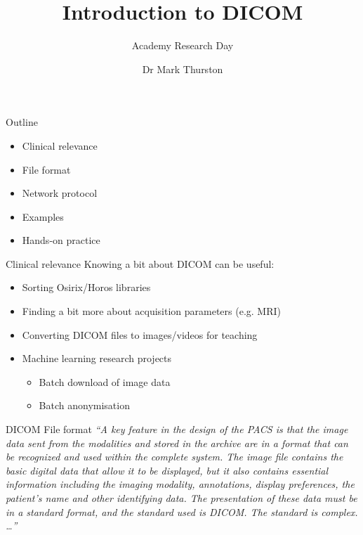 \documentclass{beamer}
\title{Introduction to DICOM}
\subtitle{Academy Research Day}
\author{Dr Mark Thurston}
\institute{\href{https://github.com/plymouth-neuroimaging/research-academy
    }{\faGithub{} plymouth-neuroimaging}
}
\date{\DTMdisplaydate{2023}{07}{28}{Friday}}
\begin{document}
\begin{frame}
    \titlepage{}
\end{frame}

\begin{frame}{Outline}
    \begin{itemize}
        \item{Clinical relevance}
        \item{File format}
        \item{Network protocol}
        \item{Examples}
        \item{Hands-on practice}
    \end{itemize}
\end{frame}

\begin{frame}{Clinical relevance}
    Knowing a bit about DICOM can be useful:
    \begin{itemize}
        \item{Sorting Osirix/Horos libraries}
        \item{Finding a bit more about acquisition parameters (e.g. MRI)}
        \item{Converting DICOM files to images/videos for teaching}
        \item{Machine learning research projects}
            \begin{itemize}
                \item{Batch download of image data}
                \item{Batch anonymisation}
            \end{itemize}
    \end{itemize}
\end{frame}

\begin{frame}{DICOM File format}
    \tiny\textit{{``A key feature in the design of the PACS is that the image
    data sent from the modalities and stored in the archive are in a format
    that can be recognized and used within the complete system. The image file
    contains the basic digital data that allow it to be displayed, but it also
    contains essential information including the imaging modality, annotations,
    display preferences, the patient’s name and other identifying data. The
    presentation of these data must be in a standard format, and the standard
    used is DICOM. The standard is complex. \ldots{}}''
    }\cite[88]{allisy-roberts_farrs_2008}
\end{frame}
\end{document}
